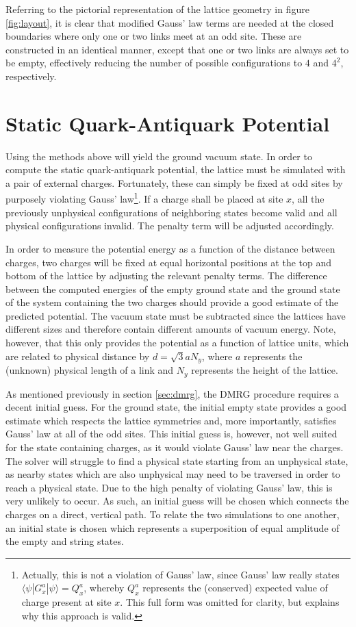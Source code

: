 \documentclass[a4paper,oneside, 11pt,english,listof=totoc,bibliography=totoc]{scrbook}
\begin{document}
Referring to the pictorial representation of the lattice geometry in figure \ref{fig:layout}, it is clear that modified Gauss' law terms are needed at the closed boundaries where only one or two links meet at an odd site. These are constructed in an identical manner, except that one or two links are always set to be empty, effectively reducing the number of possible configurations to $4$ and $4^2$, respectively.

\section{Static Quark-Antiquark Potential}\label{sec:potential}
Using the methods above will yield the ground vacuum state. In order to compute the static quark-antiquark potential, the lattice must be simulated with a pair of external charges. Fortunately, these can simply be fixed at odd sites by purposely violating Gauss' law\footnote{Actually, this is not a violation of Gauss' law, since Gauss' law really states $\langle\psi|G^a_x|\psi\rangle=Q^a_x$, whereby $Q^a_x$ represents the (conserved) expected value of charge present at site $x$. This full form was omitted for clarity, but explains why this approach is valid.}. If a charge shall be placed at site $x$, all the previously unphysical configurations of neighboring states become valid and all physical configurations invalid. The penalty term will be adjusted accordingly.

In order to measure the potential energy as a function of the distance between charges, two charges will be fixed at equal horizontal positions at the top and bottom of the lattice by adjusting the relevant penalty terms. The difference between the computed energies of the empty ground state and the ground state of the system containing the two charges should provide a good estimate of the predicted potential. The vacuum state must be subtracted since the lattices have different sizes and therefore contain different amounts of vacuum energy. Note, however, that this only provides the potential as a function of lattice units, which are related to physical distance by $d=\sqrt{3}aN_y$, where $a$ represents the (unknown) physical length of a link and $N_y$ represents the height of the lattice.

As mentioned previously in section \ref{sec:dmrg}, the DMRG procedure requires a decent initial guess. For the ground state, the initial empty state provides a good estimate which respects the lattice symmetries and, more importantly, satisfies Gauss' law at all of the odd sites. This initial guess is, however, not well suited for the state containing charges, as it would violate Gauss' law near the charges. The solver will struggle to find a physical state starting from an unphysical state, as nearby states which are also unphysical may need to be traversed in order to reach a physical state. Due to the high penalty of violating Gauss' law, this is very unlikely to occur. As such, an initial guess will be chosen which connects the charges on a direct, vertical path. To relate the two simulations to one another, an initial state is chosen which represents a superposition of equal amplitude of the empty and string states.
\end{document}
